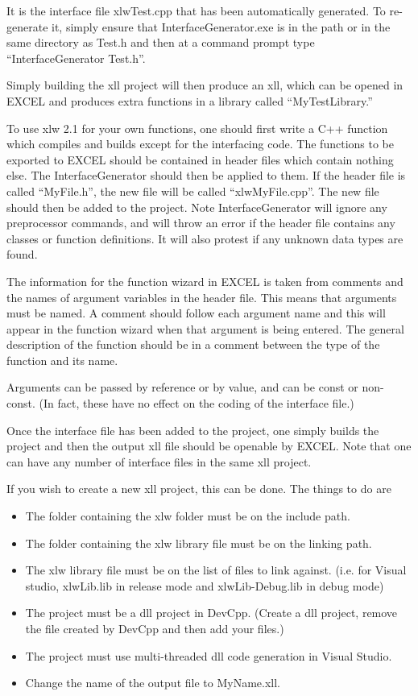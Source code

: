 \documentclass[12pt,reqno]{amsart}
\numberwithin{equation}{section}
\numberwithin{figure}{section}
\begin{document}
It is the interface file xlwTest.cpp that has been automatically
generated. To re-generate it, simply ensure that
InterfaceGenerator.exe is in the path or in the same directory as
Test.h and then at a command prompt type ``InterfaceGenerator Test.h''. 

Simply building the xll project will then produce an xll, which can be
opened in EXCEL and produces extra functions in a library called
``MyTestLibrary.'' 

To use xlw 2.1 for your own functions, one should first write a C++
function which compiles 
and builds except for the interfacing code. The functions to be
exported to EXCEL should be contained in header files which contain
nothing else. The InterfaceGenerator should then be applied to
them. If the header file is called ``MyFile.h'', the new file will be
called ``xlwMyFile.cpp''. The new file should then be added to the
project. Note InterfaceGenerator will ignore any preprocessor
commands, and will throw an error if the header file contains any
classes or function definitions. It will also protest if any unknown
data types are found. 

The information for the function wizard in EXCEL is taken from
comments and the names of argument variables in the header file. This
means that arguments must be named. A comment should follow each
argument name and this will appear in the function wizard when that
argument is being entered. The general description of the function
should be in a comment between the type of the function and its name. 

Arguments can be passed by reference or by value, and can be const or
non-const. (In fact, these have no effect on the coding of the
interface file.)

Once  the interface file has been added to the project, one simply
builds the project
and then the output xll file should be openable by EXCEL. Note that
one can
have any number of interface files in the same xll project. 

If you wish to create a new xll project, this can be done. The things
to do are 
\begin{itemize}
\item The folder containing the xlw folder must be on the include path.
\item The folder containing the xlw library file must be on the linking
  path.
\item The xlw library file must be on the list of files to link
  against. (i.e. for Visual studio, 
 xlwLib.lib in release mode and xlwLib-Debug.lib in
  debug mode)
\item The project must be a dll project in DevCpp. (Create a dll
  project, remove the file created by DevCpp and then add your files.) 
\item The project must use multi-threaded dll code generation in
  Visual Studio. 
\item Change the name of the output file to MyName.xll. 
\end{itemize}
\end{document}
